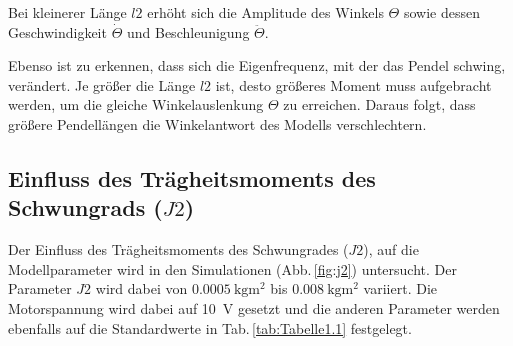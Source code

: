 Bei kleinerer Länge $l2$ erhöht sich die Amplitude des Winkels $\Theta$ sowie dessen Geschwindigkeit $\dot\Theta$ und Beschleunigung $\ddot\Theta$. 

Ebenso ist zu erkennen, dass sich die Eigenfrequenz, mit der das Pendel schwing, verändert.
Je größer die Länge $l2$ ist, desto größeres Moment muss aufgebracht werden, um die gleiche Winkelauslenkung $\Theta$ zu erreichen. 
Daraus folgt, dass größere Pendellängen die Winkelantwort des Modells verschlechtern. 

\subsection*{Einfluss des Trägheitsmoments des Schwungrads ($J2$)}
Der Einfluss des Trägheitsmoments des Schwungrades ($J2$), auf die Modellparameter wird in den Simulationen (Abb.\,\ref{fig:j2}) untersucht. 
Der Parameter $J2$ wird dabei von $\SI{0.0005}{\kg\m^2}$ bis $\SI{0.008}{\kg\m^2}$ variiert.
Die Motorspannung wird dabei auf \SI{10}{\volt} gesetzt und die anderen Parameter werden ebenfalls auf die Standardwerte in Tab.\,\ref{tab:Tabelle1.1} festgelegt.\\
\pagebreak

